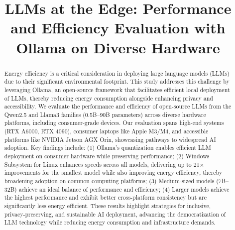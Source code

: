 \documentclass[conference]{IEEEtran}
\begin{document}
\title{
LLMs at the Edge: Performance and Efficiency Evaluation with Ollama on Diverse Hardware
}




\author{

}

\maketitle

\begin{abstract}
Energy efficiency is a critical consideration in deploying large language models (LLMs) due to their significant environmental footprint. This study addresses this challenge by leveraging Ollama, an open-source framework that facilitates efficient local deployment of LLMs, thereby reducing energy consumption alongside enhancing privacy and accessibility.
We evaluate the performance and efficiency of open-source LLMs from the Qwen2.5 and Llama3 families (0.5B–90B parameters) across diverse hardware platforms, including consumer-grade devices. Our evaluation spans high-end systems (RTX A6000, RTX 4090), consumer laptops like Apple M3/M4, and accessible platforms like NVIDIA Jetson AGX Orin, showcasing pathways to widespread AI adoption.
Key findings include:
(1) Ollama’s quantization enables efficient LLM deployment on consumer hardware while preserving performance;
(2) Windows Subsystem for Linux enhances speeds across all models, delivering up to 21× improvements for the smallest model while also improving energy efficiency, thereby broadening adoption on common computing platforms; 
(3) Medium-sized models (7B–32B) achieve an ideal balance of performance and efficiency; 
(4) Larger models achieve the highest performance and exhibit better cross-platform consistency but are significantly less energy efficient.
These results highlight strategies for inclusive, privacy-preserving, and sustainable AI deployment, advancing the democratization of LLM technology while reducing energy consumption and infrastructure demands.
\end{abstract}
\end{document}
